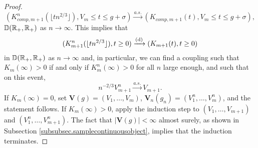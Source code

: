\begin{proof}
$$\left(K^n_{comp,m+1}\left(\lfloor t n^{2/3}\rfloor \right),V_m\leq t \leq g+\sigma\right)\overset{a.s.}{\to}\left(K_{comp,m+1}(t),V_m\leq t \leq g+\sigma\right),$$
${\mathbb D}({\mathbb R}_+,{\mathbb R}_+)$ as $n\to\infty$. This implies that 
$$(K^n_{m+1}(\lfloor t n^{2/3} \rfloor ),t\geq 0)\xrightarrow[]{\mathrm{(d)}} (K_{m+1}(t),t\geq 0)$$ in ${\mathbb D}({\mathbb R}_+,{\mathbb R}_+)$ as $n\to\infty$ and, in particular, we can find a coupling such that $K_m(\infty)>0$ if and only if $K^n_m(\infty)>0$ for all $n$ large enough, and such that on this event,
$$n^{-2/3}V_{m+1}^n\overset{a.s.}{\to}V_{m+1}.$$
If $K_m(\infty)=0$, set $\mathbf{V}(g)=(V_1,\dots,V_m)$, $\mathbf{V}_n(g_n)=(V^n_1,\dots,V^n_m)$, and the statement follows. If $K_m(\infty)>0$, apply the induction step to $(V_1,\dots,V_{m+1})$ and $(V^n_1,\dots,V^n_{m+1})$. The fact that $|\mathbf{V}(g)|<\infty$ almost surely, as shown in Subsection \ref{subsubsec.samplecontinuousobject}, implies that the induction terminates.
\end{proof}

